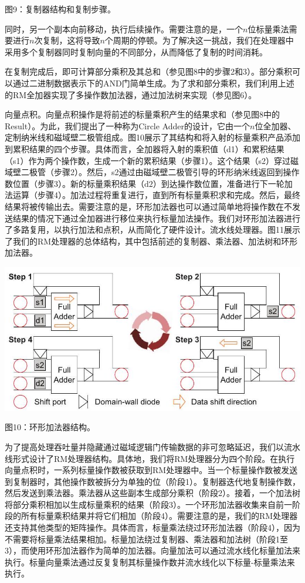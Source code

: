 \documentclass[10pt]{article}
\begin{document}
图9：复制器结构和复制步骤。

 同时，另一个副本向前移动，执行后续操作。需要注意的是，一个$n$位标量乘法需要进行$n$次复制，这将导致$n$个周期的停顿。为了解决这一挑战，我们在处理器中采用多个复制器同时复制向量的不同部分，从而降低了复制的时间消耗。

在复制完成后，即可计算部分乘积及其总和（参见图8中的步骤2和3）。部分乘积可以通过二进制数据表示下的AND门简单生成。为了求和部分乘积，我们利用上述的RM全加器实现了多操作数加法器，通过加法树来实现（参见图6）。

向量点积。向量点积操作是将前述的标量乘积产生的结果求和（参见图8中的Result）。为此，我们提出了一种称为Circle Adder的设计，它由一个$n$位全加器、定制纳米线和磁域壁二极管组成。图10展示了其结构和将入射的标量乘积产品添加到累积结果的四个步骤。具体而言，全加器将入射的乘积值（d1）和累积结果（s1）作为两个操作数，生成一个新的累积结果（步骤1）。这个结果（s2）穿过磁域壁二极管（步骤2）。然后，s2通过由磁域壁二极管引导的环形纳米线返回到操作数位置（步骤3）。新的标量乘积结果（$\mathrm{d} 2$）到达操作数位置，准备进行下一轮加法运算（步骤4）。加法过程将重复进行，直到所有标量乘积求和完成。然后，最终结果将被传输出去。需要注意的是，环形加法器也可以通过简单地将操作数在不发送结果的情况下通过全加器进行移位来执行标量加法操作。我们对环形加法器进行了多路复用，以执行加法和点积，从而简化了硬件设计。流水线处理器。图11展示了我们的RM处理器的总体结构，其中包括前述的复制器、乘法器、加法树和环形加法器。

\begin{center}
\includegraphics[max width=\textwidth]{2024_05_12_abeba8a85da5b5ec4c7bg-06(1)}
\end{center}

图10：环形加法器结构。

为了提高处理吞吐量并隐藏通过磁域逻辑门传输数据的非可忽略延迟，我们以流水线形式设计了RM处理器结构。具体地，我们将RM处理器分为四个阶段。在执行向量点积时，一系列标量操作数被获取到RM处理器中。当一个标量操作数被发送到复制器时，其他操作数被拆分为单独的位（阶段1）。复制器迭代地复制操作数，然后发送到乘法器。乘法器从这些副本生成部分乘积（阶段2）。接着，一个加法树将部分乘积相加以生成标量乘积的结果（阶段3）。一个环形加法器收集来自前一阶段的所有标量乘积结果并将它们相加（阶段4）。需要注意的是，我们的RM处理器还支持其他类型的矩阵操作。具体而言，标量乘法绕过环形加法器（阶段4），因为不需要将标量乘法结果相加。标量加法绕过复制器、乘法器和加法树（阶段1至3），而使用环形加法器作为简单的加法器。向量加法可以通过流水线化标量加法来执行。标量向量乘法通过反复复制其标量操作数并流水线化以下标量-标量乘法来执行。
\end{document}
